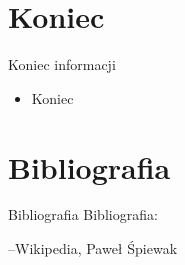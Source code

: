 \documentclass{beamer}
\begin{document}
\section{Koniec}
\begin{frame}{Koniec informacji}
\begin {itemize}
\item Koniec
\end {itemize}
\end {frame}

\section{Bibliografia}
\begin{frame}{Bibliografia}
Bibliografia:
\begin{thebibliography}{9}
--Wikipedia, Paweł Śpiewak
\end{thebibliography}
\end{frame}
\end{document}
